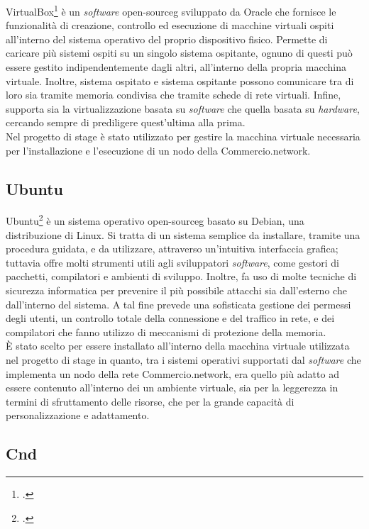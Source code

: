 VirtualBox\footcite{site:virtual-box} è un \textit{software} \gls{open-sourceg} sviluppato da Oracle che fornisce le funzionalità di creazione, controllo ed esecuzione di macchine virtuali ospiti all'interno del sistema operativo del proprio dispositivo fisico. Permette di caricare più sistemi ospiti su un singolo sistema ospitante, ognuno di questi può essere gestito indipendentemente dagli altri, all'interno della propria macchina virtuale. Inoltre, sistema ospitato e sistema ospitante possono comunicare tra di loro sia tramite memoria condivisa che tramite schede di rete virtuali. Infine, supporta sia la virtualizzazione basata su \textit{software} che quella basata su \textit{hardware}, cercando sempre di prediligere quest'ultima alla prima.\\
Nel progetto di stage è stato utilizzato per gestire la macchina virtuale necessaria per l'installazione e l'esecuzione di un nodo della Commercio.network.

\subsection*{Ubuntu}

Ubuntu\footcite{site:ubuntu} è un sistema operativo \gls{open-sourceg} basato su Debian, una distribuzione di Linux. Si tratta di un sistema semplice da installare, tramite una procedura guidata, e da utilizzare, attraverso un'intuitiva interfaccia grafica; tuttavia offre molti strumenti utili agli sviluppatori \textit{software}, come gestori di pacchetti, compilatori e ambienti di sviluppo. Inoltre, fa uso di molte tecniche di sicurezza informatica per prevenire il più possibile attacchi sia dall'esterno che dall'interno del sistema. A tal fine prevede una sofisticata gestione dei permessi degli utenti, un controllo totale della connessione e del traffico in rete, e dei compilatori che fanno utilizzo di meccanismi di protezione della memoria. \\
È stato scelto per essere installato all'interno della macchina virtuale utilizzata nel progetto di stage in quanto, tra i sistemi operativi supportati dal \textit{software} che implementa un nodo della rete Commercio.network, era quello più adatto ad essere contenuto all'interno dei un ambiente virtuale, sia per la leggerezza in termini di sfruttamento delle risorse, che per la grande capacità di personalizzazione e adattamento.

\subsection*{Cnd}

